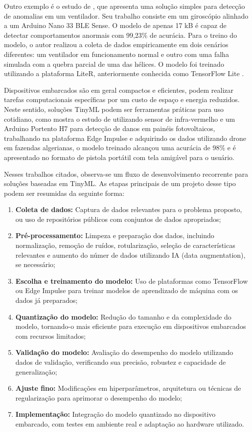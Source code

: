 \documentclass[repeatfields,xlists,xpacks,oneside]{ufrgscca}
\begin{document}
Outro exemplo é o estudo de \cite{Yap2024}, que apresenta uma solução simples para detecção de anomalias em um ventilador. Seu trabalho consiste em um giroscópio alinhado a um Arduino Nano 33 BLE Sense. O modelo de apenas 17 kB é capaz de detectar comportamentos anormais com 99,23\% de acurácia. Para o treino do modelo, o autor realizou a coleta de dados empiricamente em dois cenários diferentes: um ventilador em funcionamento normal e outro com uma falha simulada com a quebra parcial de uma das hélices. O modelo foi treinado utilizando a plataforma LiteR, anteriormente conhecida como TensorFlow Lite \cite{litert2024}.

Dispositivos embarcados são em geral compactos e eficientes, podem realizar tarefas computacionais específicas por um custo de espaço e energia reduzidos. Neste sentido, soluções TinyML podem ser ferramentas práticas para uso cotidiano, como mostra o estudo de \cite{Mellit2025} utilizando sensor de infra-vermelho e um Arduino Portento H7 para detecção de danos em painéis fotovoltaicos, trabalhando na plataforma Edge Impulse e adquirindo os dados utilizando drone em fazendas algerianas, o modelo treinado alcançou uma acurácia de 98\% e é apresentado no formato de pistola portátil com tela amigável para o usuário.

Nesses trabalhos citados, observa-se um fluxo de desenvolvimento recorrente para soluções baseadas em TinyML. As etapas principais de um projeto desse tipo podem ser resumidas da seguinte forma:

\begin{enumerate}
    \item \textbf{Coleta de dados:} Captura de dados relevantes para o problema proposto, ou uso de repositórios públicos com conjuntos de dados apropriados;
    \item \textbf{Pré-processamento:} Limpeza e preparação dos dados, incluindo normalização, remoção de ruídos, rotularização, seleção de características relevantes e aumento do númer de dados utilizando IA (data augmentation), se necessário;
    \item \textbf{Escolha e treinamento do modelo:} Uso de plataformas como TensorFlow ou Edge Impulse para treinar modelos de aprendizado de máquina com os dados já preparados;
    \item \textbf{Quantização do modelo:} Redução do tamanho e da complexidade do modelo, tornando-o mais eficiente para execução em dispositivos embarcados com recursos limitados;
    \item \textbf{Validação do modelo:} Avaliação do desempenho do modelo utilizando dados de validação, verificando sua precisão, robustez e capacidade de generalização;
    \item \textbf{Ajuste fino:} Modificações em hiperparâmetros, arquitetura ou técnicas de regularização para aprimorar o desempenho do modelo;
    \item \textbf{Implementação:} Integração do modelo quantizado no dispositivo embarcado, com testes em ambiente real e adaptação ao hardware utilizado.
\end{enumerate}
\end{document}
